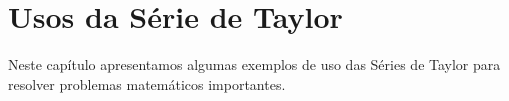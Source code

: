 \chapter{Usos da Série de Taylor}
\label{cap:usos_taylor}

\minitoc

Neste capítulo apresentamos algumas exemplos de uso das Séries de Taylor para
resolver problemas matemáticos importantes.









